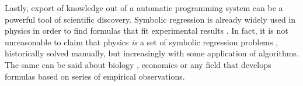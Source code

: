 Lastly, export of knowledge out of a automatic programming system can be a powerful tool of scientific discovery. 
Symbolic regression is already widely used in physics in order to find formulas that fit experimental results \cite{angelisArtificialIntelligencePhysical2023, tenachiDeepSymbolicRegression2023}. 
In fact, it is not unreasonable to claim that physics \emph{is} a set of symbolic regression problems \cite{udrescuAIFeynmanPhysicsinspired2020}, historically solved manually, but increasingly with some application of algorithms. 
The same can be said about biology \cite{chenRevealingComplexEcological2019}, economics \cite{claveriaAssessmentEffectFinancial2017, lianModelingForecastingPassenger2018, panInfluentialFactorsCarbon2019, truscottDetectingShadowEconomy2011, truscottExplainingUnemploymentRates2014, yamashitaCustomizedPredictionAttendance2022} or any field that develops formulas based on series of empirical observations.
